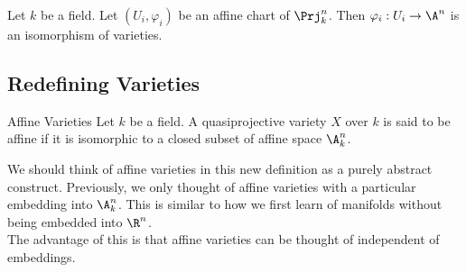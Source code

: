 \documentclass[a4paper]{article}
\begin{document}
\begin{prp}{}{} Let $k$ be a field. Let $(U_i,\varphi_i)$ be an affine chart of $\Prj_k^n$. Then $\varphi_i:U_i\to\A^n$ is an isomorphism of varieties. 
\end{prp}

\subsection{Redefining Varieties}
\begin{defn}{Affine Varieties}{} Let $k$ be a field. A quasiprojective variety $X$ over $k$ is said to be affine if it is isomorphic to a closed subset of affine space $\A_k^n$. 
\end{defn}

We should think of affine varieties in this new definition as a purely abstract construct. Previously, we only thought of affine varieties with a particular embedding into $\A_k^n$. This is similar to how we first learn of manifolds without being embedded into $\R^n$. \\

The advantage of this is that affine varieties can be thought of independent of embeddings. 
\end{document}
